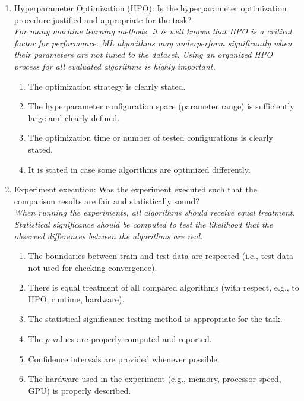 \documentclass{article}
\begin{document}
\begin{enumerate}
    \item Hyperparameter Optimization (HPO): 
    Is the hyperparameter optimization procedure justified and appropriate for the task? \\
    \emph{For many machine learning methods, it is well known that HPO is a critical factor for performance. ML algorithms may underperform significantly when their parameters are not tuned to the dataset. Using an organized HPO process for all evaluated algorithms is highly important.}
    \begin{enumerate} [label*=\arabic*.]
        \item The optimization strategy is clearly stated.
        \item The hyperparameter configuration space (parameter range) is sufficiently large and clearly defined.
        \item The optimization time or number of tested configurations is clearly stated.
        \item It is stated in case some algorithms are optimized differently.
    \end{enumerate}
    
    \item Experiment execution: 
    Was the experiment executed such that the comparison results are fair and statistically sound? \\
    \emph{When running the experiments, all algorithms should receive equal treatment. Statistical significance should be computed to test the likelihood that the observed differences between the algorithms are real.}
    \begin{enumerate} [label*=\arabic*.]
        \item The boundaries between train and test data are respected (i.e., test data not used for checking convergence).
        \item There is equal treatment of all compared algorithms (with respect, e.g., to HPO, runtime, hardware).
        \item The statistical significance testing method is appropriate for the task.
        \item The $p$-values are properly computed and reported.
        \item Confidence intervals are provided whenever possible.
        \item The hardware used in the experiment (e.g., memory, processor speed, GPU) is properly described.
    \end{enumerate}
     

\end{enumerate}
\end{document}
